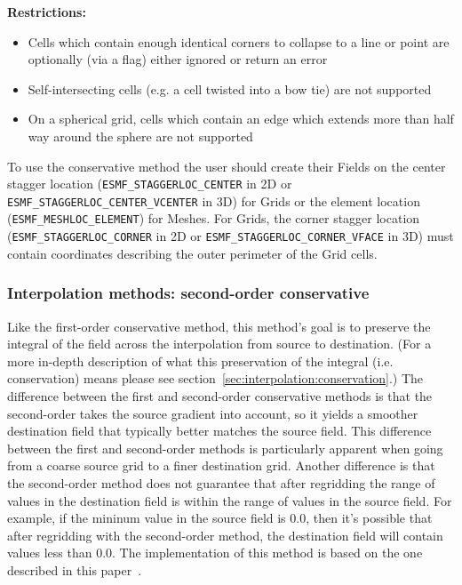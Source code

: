 \smallskip

{\bf Restrictions:}
 \begin{itemize}
 \item Cells which contain enough identical corners to collapse to a line or point are optionally (via a flag) either ignored or return an error
 \item Self-intersecting cells (e.g. a cell twisted into a bow tie) are not supported
 \item On a spherical grid, cells which contain an edge which extends more than half way around the sphere are not supported 
 \end{itemize}

\smallskip

 To use the conservative method the user should create their Fields on the center 
 stagger location ({\tt ESMF\_STAGGERLOC\_CENTER} in 2D or {\tt ESMF\_STAGGERLOC\_CENTER\_VCENTER} in 3D) for Grids  or the element location ({\tt ESMF\_MESHLOC\_ELEMENT}) for Meshes.
 For Grids, the corner stagger location ({\tt ESMF\_STAGGERLOC\_CORNER} in 2D or {\tt ESMF\_STAGGERLOC\_CORNER\_VFACE} in 3D) must contain coordinates describing the outer perimeter of the Grid cells. 

\subsubsection{Interpolation methods: second-order conservative}\label{sec:interpolation:conserve_2ndorder}
 Like the first-order conservative method, this method's goal is to preserve the integral of the field across the interpolation from source to destination.  
 (For a more in-depth description of what this preservation of the integral (i.e. conservation) means please see section~\ref{sec:interpolation:conservation}.)  The difference between the first and second-order conservative methods is that the second-order takes the source gradient into account, so
 it yields a smoother destination field that typically better matches the source field. This difference between the first and second-order methods 
 is particularly apparent when going from a coarse source grid to a finer destination grid. Another difference is that the second-order method
  does not guarantee that after regridding the range of values in the destination field is within the range of 
 values in the source field. For example, if the mininum value in the source field is 0.0, then it's possible that after regridding with the 
 second-order method, the destination field will contain values less than 0.0.  The implementation of this method is based on the one 
  described in this paper~\cite{ConservativeOrder2}. 


